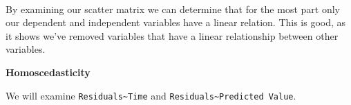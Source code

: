 \documentclass{article}
\begin{document}
    \begin{center}
    \end{center}
    { \hspace*{\fill} \\}
    
    By examining our scatter matrix we can determine that for the most part
only our dependent and independent variables have a linear relation.
This is good, as it shows we've removed variables that have a linear
relationship between other variables.

\textbf{Homoscedasticity}

We will examine \texttt{Residuals\textasciitilde{}Time} and
\texttt{Residuals\textasciitilde{}Predicted Value}.
\end{document}
